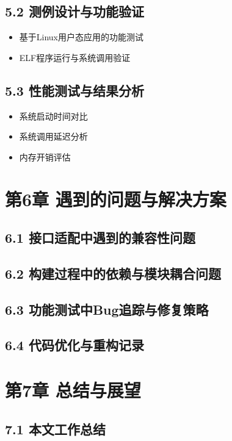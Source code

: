 \documentclass{article}
\begin{document}
\subsection{5.2 测例设计与功能验证}

\begin{itemize}
    \item 基于Linux用户态应用的功能测试
    \item ELF程序运行与系统调用验证
\end{itemize}

\subsection{5.3 性能测试与结果分析}

\begin{itemize}
    \item 系统启动时间对比
    \item 系统调用延迟分析
    \item 内存开销评估
\end{itemize}

\section{第6章 遇到的问题与解决方案}

\subsection{6.1 接口适配中遇到的兼容性问题}

\subsection{6.2 构建过程中的依赖与模块耦合问题}

\subsection{6.3 功能测试中Bug追踪与修复策略}

\subsection{6.4 代码优化与重构记录}

\section{第7章 总结与展望}

\subsection{7.1 本文工作总结}
\end{document}
